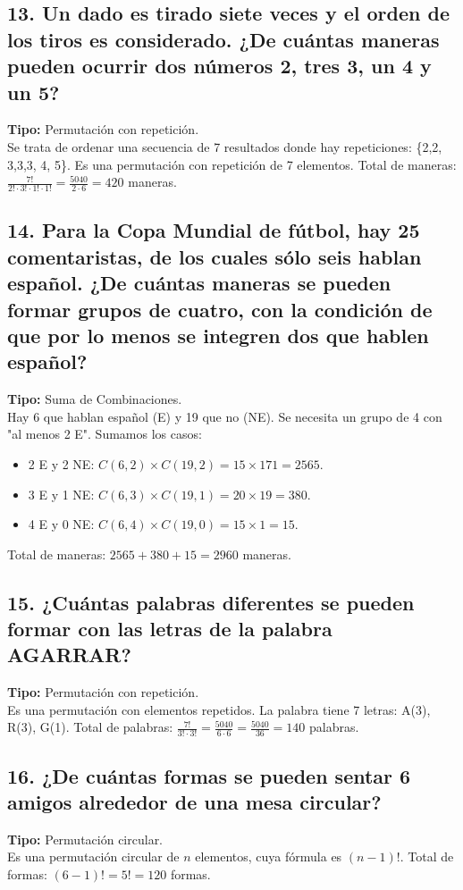 \documentclass[11pt]{article}
\begin{document}
    \subsection*{13. Un dado es tirado siete veces y el orden de los tiros es considerado. ¿De cuántas maneras pueden ocurrir dos números 2, tres 3, un 4 y un 5?}
    \textbf{Tipo:} Permutación con repetición. \\
    Se trata de ordenar una secuencia de 7 resultados donde hay repeticiones: \{2,2, 3,3,3, 4, 5\}. Es una permutación con repetición de 7 elementos.
    Total de maneras: $\frac{7!}{2! \cdot 3! \cdot 1! \cdot 1!} = \frac{5040}{2 \cdot 6} = 420$ maneras.

    \subsection*{14. Para la Copa Mundial de fútbol, hay 25 comentaristas, de los cuales sólo seis hablan español. ¿De cuántas maneras se pueden formar grupos de cuatro, con la condición de que por lo menos se integren dos que hablen español?}
    \textbf{Tipo:} Suma de Combinaciones. \\
    Hay 6 que hablan español (E) y 19 que no (NE). Se necesita un grupo de 4 con "al menos 2 E". Sumamos los casos:
    \begin{itemize}
        \item 2 E y 2 NE: $C(6,2) \times C(19,2) = 15 \times 171 = 2565$.
        \item 3 E y 1 NE: $C(6,3) \times C(19,1) = 20 \times 19 = 380$.
        \item 4 E y 0 NE: $C(6,4) \times C(19,0) = 15 \times 1 = 15$.
    \end{itemize}
    Total de maneras: $2565 + 380 + 15 = 2960$ maneras.

    \subsection*{15. ¿Cuántas palabras diferentes se pueden formar con las letras de la palabra AGARRAR?}
    \textbf{Tipo:} Permutación con repetición. \\
    Es una permutación con elementos repetidos. La palabra tiene 7 letras: A(3), R(3), G(1).
    Total de palabras: $\frac{7!}{3! \cdot 3!} = \frac{5040}{6 \cdot 6} = \frac{5040}{36} = 140$ palabras.

    \subsection*{16. ¿De cuántas formas se pueden sentar 6 amigos alrededor de una mesa circular?}
    \textbf{Tipo:} Permutación circular. \\
    Es una permutación circular de $n$ elementos, cuya fórmula es $(n-1)!$.
    Total de formas: $(6-1)! = 5! = 120$ formas.
\end{document}
